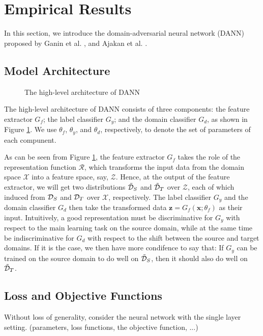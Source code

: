 \section{Empirical Results}
In this section, we introduce the domain-adversarial neural network (DANN) proposed by Ganin et al. \cite{Ganin2016}, \cite{Ganin2015} and Ajakan et al. \cite{Ajakan2014}.

\subsection{Model Architecture}\label{sub:model_arch}
\begin{figure}
  \centering
  
  \caption{The high-level architecture of DANN}
  \label{fig:dann_arch}
\end{figure}

The high-level architecture of DANN consists of three components: the feature extractor $G_f$; the label classifier $G_y$; and the domain classifier $G_d$, as shown in Figure \ref{fig:dann_arch}. We use $\theta_f$, $\theta_y$, and $\theta_d$, respectively, to denote the set of parameters of each compunent.

As can be seen from Figure \ref{fig:dann_arch}, the feature extractor $G_f$ takes the role of the representation function $\mathcal{R}$, which transforms the input data from the domain space $\mathcal{X}$ into a feature space, say, $\mathcal{Z}$. Hence, at the output of the feature extractor, we will get two distributions $\tilde{\mathcal{D}}_S$ and $\tilde{\mathcal{D}}_T$ over $\mathcal{Z}$, each of which induced from $\mathcal{D}_S$ and $\mathcal{D}_T$ over $\mathcal{X}$, respectively. The label classifier $G_y$ and the domain classifier $G_d$ then take the transformed data $\mathbf{z}=G_f(\mathbf{x};\theta_f)$ as their input. Intuitively, a good representation must be discriminative for $G_y$ with respect to the main learning task on the source domain, while at the same time be indiscriminative for $G_d$ with respect to the shift between the source and target domains. If it is the case, we then have more condifence to say that: If $G_y$ can be trained on the source domain to do well on $\tilde{\mathcal{D}}_S$, then it should also do well on $\tilde{\mathcal{D}}_T$.

\subsection{Loss and Objective Functions}
Without loss of generality, consider the neural network with the single layer setting. (parameters, loss functions, the objective function, ...)

